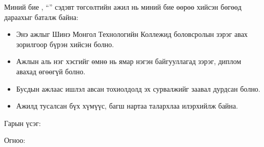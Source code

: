 \begin{declaration}
\addchaptertocentry{\authorshipname}
\scshape\Large \textbf{\authorshipname}\vspace{1.2cm}
\normalfont\normalsize

\noindent Миний бие \shortname, “\ttitle” сэдэвт төгсөлтийн ажил нь миний бие өөрөө хийсэн бөгөөд дараахыг баталж байна:

\begin{itemize}
    \item Энэ ажлыг Шинэ Монгол Технологийн Коллежид боловсролын зэрэг авах зорилгоор бүрэн хийсэн болно.
    \item Ажлын аль нэг хэсгийг өмнө нь ямар нэгэн байгууллагад зэрэг, диплом авахад өгөөгүй болно.
    \item Бусдын ажлаас ишлэл авсан тохиолдолд эх сурвалжийг заавал дурдсан болно.
    \item Ажилд тусалсан бүх хүмүүс, багш нартаа талархлаа илэрхийлж байна.
\end{itemize}

\vspace{2cm}

\noindent Гарын үсэг: \hspace{8cm}

\vspace{1cm}
\noindent Огноо: \makebox[8cm]{\hrulefill}

\end{declaration}